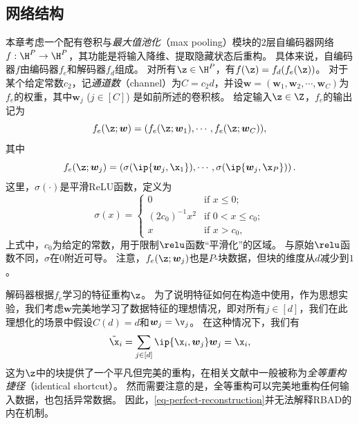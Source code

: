 \subsection{网络结构}\label{sec-network-structure}
本章考虑一个配有卷积与\emph{最大值池化}（max pooling）模块的$2$层自编码器网络$f: \H^P \to \H^P$，其功能是将输入降维、提取隐藏状态后重构。
具体来说，自编码器$f$由编码器$f_e$和解码器$f_d$组成。
对所有$ \z \in \H^P$，有$f(\z) = f_d(f_e(\z))$。
对于某个给定常数$c_2$，记\emph{通道数}（channel）为$C = c_2 d$，并设$\boldsymbol{w} = (\boldsymbol{w}_1, \boldsymbol{w}_2, \cdots, \boldsymbol{w}_{C})$为$f_e$的权重，其中$\boldsymbol{w}_j$ ($j \in [C]$) 是如前所述的卷积核。
给定输入$\z \in \Z$，$f_e$的输出记为
\[
    f_e(\z; \boldsymbol{w}) = (f_e(\z; \boldsymbol{w}_1), \cdots, f_e(\z; \boldsymbol{w}_C)),
\]
其中
\begin{equation}\label{eq-def-phi-e-entries}
    f_e(\z; \boldsymbol{w}_j) = \left( \sigma(\ip{\boldsymbol{w}_j,\x_1}), \cdots, \sigma(\ip{\boldsymbol{w}_j,\x_P}) \right).
\end{equation}
这里，$\sigma(\cdot)$是{平滑ReLU函数}，定义为
\begin{equation}\label{eq-def-smoothed-relu}
    \sigma(x) = \left\{
    \begin{array}{cl}
        0 & \mbox{if } x \leq 0; \\
        (2c_0)^{-1} x^2&\mbox{if }  0 < x \leq c_0; \\
        x& \mbox{if } x > c_0,
    \end{array}
    \right. 
\end{equation}
上式中，$c_0$为给定的常数，用于限制$\relu$函数“平滑化”的区域。
与原始$\relu$函数不同，$\sigma$在$0$附近可导。
注意，$f_e(\z; \boldsymbol{w}_j)$也是$P$-块数据，但块的维度从$d$减少到$1$。

解码器根据$f_e$学习的特征重构$\z$。
为了说明特征如何在构造中使用，作为思想实验，我们考虑$\boldsymbol{w}$完美地学习了数据特征的理想情况，即对所有$ j \in [d]$，我们在此理想化的场景中假设$C(d) = d$和$\boldsymbol{w}_j = \v_j$。
在这种情况下，我们有
\begin{equation}\label{eq-perfect-reconstruction}
    \tilde{\x}_i = \sum_{j \in [d]} \ip{\x_i,\boldsymbol{w}_j} \boldsymbol{w}_j = \x_i,
\end{equation}
这为$\z$中的块提供了一个平凡但完美的重构，在相关文献中一般被称为\emph{全等重构捷径}\cite{DBLP:conf/nips/YouCSYL0L22}（identical shortcut）。
然而需要注意的是，全等重构可以完美地重构任何输入数据，也包括异常数据。
因此，\cref{eq-perfect-reconstruction}并无法解释RBAD的内在机制。

